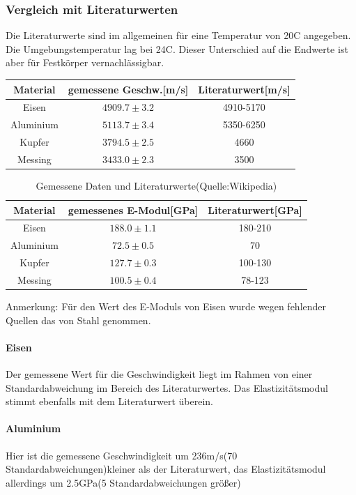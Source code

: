 \documentclass[12pt,a4paper]{article}
\begin{document}
\subsubsection{Vergleich mit Literaturwerten}
Die Literaturwerte sind im allgemeinen für eine Temperatur von 20C angegeben. Die Umgebungstemperatur lag bei 24C. Dieser Unterschied auf die Endwerte ist aber für Festkörper vernachlässigbar.
\begin{table}
\begin{tabular}{|c|c|c|}
\hline 
Material & gemessene Geschw.[m/s] & Literaturwert[m/s] \\ 
\hline 
Eisen & $4909.7\pm3.2$ & 4910-5170  \\ 
\hline 
Aluminium & $5113.7\pm3.4$ & 5350-6250  \\ 
\hline 
Kupfer & $3794.5\pm2.5$ & 4660 \\ 
\hline 
Messing & $3433.0\pm2.3$ & 3500 \\ 
\hline 
\end{tabular} 
\end{table}
\begin{table}
\begin{tabular}{|c|c|c|}
\hline 
Material & gemessenes E-Modul[GPa] & Literaturwert[GPa] \\ 
\hline 
Eisen & $188.0\pm1.1$ & 180-210 \\ 
\hline 
Aluminium & $72.5\pm0.5$ & 70 \\ 
\hline 
Kupfer & $127.7\pm0.3$ & 100-130 \\ 
\hline 
Messing & $100.5\pm0.4$ & 78-123 \\ 
\hline 
\end{tabular} 
\caption{Gemessene Daten und Literaturwerte(Quelle:Wikipedia)} 
Anmerkung: Für den Wert des E-Moduls von Eisen wurde wegen fehlender Quellen das von Stahl genommen.
\end{table}
\paragraph{Eisen}
Der gemessene Wert für die Geschwindigkeit liegt im Rahmen von einer Standardabweichung im Bereich des Literaturwertes.
Das Elastizitätsmodul stimmt ebenfalls mit dem Literaturwert überein.
\paragraph{Aluminium}
Hier ist die gemessene Geschwindigkeit um 236m/s(70 Standardabweichungen)kleiner als der Literaturwert, das Elastizitätsmodul allerdings um 2.5GPa(5 Standardabweichungen größer)
\end{document}
